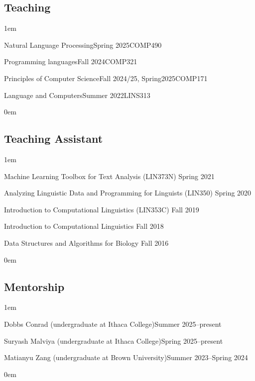 \subsection{Teaching}
\leftskip1em\relax

  {Natural Language Processing}{Spring 2025}{COMP490}{}

  {Programming languages}{Fall 2024}{COMP321}{}
  
  {Principles of Computer Science}{Fall 2024/25, Spring2025}{COMP171}{}

  {Language and Computers}{Summer 2022}{LINS313}{}

\leftskip0em\relax
  
\subsection{Teaching Assistant}
\leftskip1em\relax
\vspace{0.6\baselineskip}

\textbullet\enspace Machine Learning Toolbox for Text Analysis ({\rmsc LIN373N}) \hfill Spring 2021

\textbullet\enspace Analyzing Linguistic Data and Programming for Linguists ({\rmsc LIN350}) \hfill Spring 2020

\textbullet\enspace Introduction to Computational Linguistics ({\rmsc LIN353C}) \hfill Fall 2019

\textbullet\enspace Introduction to Computational Linguistics \hfill Fall 2018

\textbullet\enspace Data Structures and Algorithms for Biology \hfill Fall 2016

\leftskip0em\relax

\subsection{Mentorship}
\leftskip1em\relax

  {\normalsize Dobbs Conrad (undergraduate at Ithaca College)}{\normalsize Summer 2025--present}{}{}

  {\normalsize Suryash Malviya (undergraduate at Ithaca College)}{\normalsize Spring 2025--present}{}{}
  
  {\normalsize Matianyu Zang (undergraduate at Brown University)}{\normalsize Summer 2023--Spring 2024}{}{}

\leftskip0em\relax
